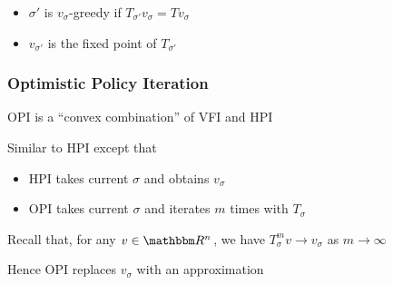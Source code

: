 \documentclass[xcolor=dvipsnames]{beamer}
\newcommand{\RR}{\mathbbm R}
\newcommand{\1}{\mathbbm 1}
\begin{document}
\begin{frame}
 
    \begin{figure} 
        \centering
    \end{figure}

    \begin{itemize}
        \item $\sigma'$ is $v_\sigma$-greedy if $T_{\sigma'} v_\sigma = T
            v_\sigma$
        \vspace{0.5em}
        \item $v_{\sigma'}$ is the fixed point of $T_{\sigma'}$
    \end{itemize}

\end{frame}


\begin{frame}
    \frametitle{Optimistic Policy Iteration}

    OPI is a ``convex combination'' of VFI and HPI

    \vspace{0.5em}
    Similar to HPI except that
    \begin{itemize}
        \item HPI takes current $\sigma$ and obtains $v_\sigma$
    \vspace{0.5em}
        \item OPI takes current $\sigma$ and iterates $m$ times with $T_{\sigma}$
    \end{itemize}


    \vspace{0.5em}
    Recall that, for any $v \in \RR^n$, we have $T^m_{\sigma} v \to v_\sigma$ as $m \to \infty$

    \vspace{0.5em}
    \vspace{0.5em}
    Hence OPI replaces $v_\sigma$ with an approximation

\end{frame}
\end{document}
